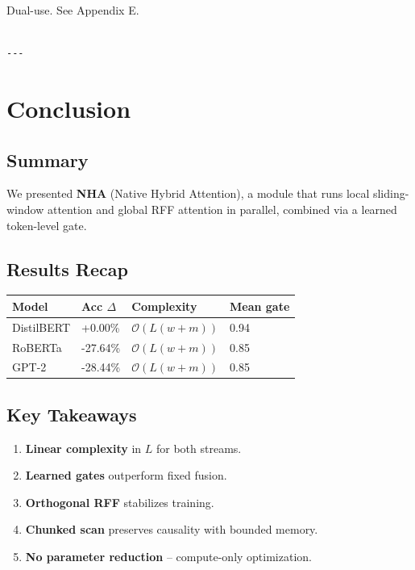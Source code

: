 Dual-use. See Appendix E.
\begin{lstlisting}

---
\end{lstlisting}


\section{Conclusion}

\subsection{Summary}

We presented \textbf{NHA} (Native Hybrid Attention), a module that runs local 
sliding-window attention and global RFF attention in parallel, combined via 
a learned token-level gate.

\subsection{Results Recap}

\begin{table}[H]
\centering
\small
\begin{tabular}{llll}
\toprule
\textbf{Model} & \textbf{Acc $\Delta$} & \textbf{Complexity} & \textbf{Mean gate} \\
\midrule
DistilBERT & +0.00\% & $\mathcal{O}(L(w+m))$ & 0.94 \\
RoBERTa & -27.64\% & $\mathcal{O}(L(w+m))$ & 0.85 \\
GPT-2 & -28.44\% & $\mathcal{O}(L(w+m))$ & 0.85 \\
\bottomrule
\end{tabular}
\end{table}

\subsection{Key Takeaways}

\begin{enumerate}
\item \textbf{Linear complexity} in $L$ for both streams.
\item \textbf{Learned gates} outperform fixed fusion.
\item \textbf{Orthogonal RFF} stabilizes training.
\item \textbf{Chunked scan} preserves causality with bounded memory.
\item \textbf{No parameter reduction} -- compute-only optimization.

\end{enumerate}
